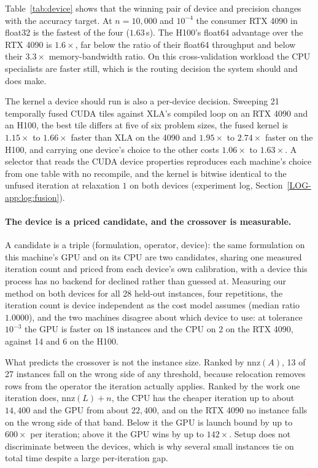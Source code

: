 Table~\ref{tab:device} shows that the winning pair of device and precision
changes with the accuracy target. At $n = 10{,}000$ and $10^{-4}$ the consumer
RTX 4090 in float32 is the fastest of the four ($1.63$\,s). The H100's float64
advantage over the RTX 4090 is $1.6\times$, far below the ratio of their float64
throughput and below their $3.3\times$ memory-bandwidth ratio. On this
cross-validation workload the CPU specialists are faster still, which is the
routing decision the system should and does make.

The kernel a device should run is also a per-device decision. Sweeping 21
temporally fused CUDA tiles against XLA's compiled loop on an RTX 4090 and an
H100, the best tile differs at five of six problem sizes, the fused kernel is
$1.15\times$ to $1.66\times$ faster than XLA on the 4090 and $1.95\times$ to
$2.74\times$ faster on the H100, and carrying one device's choice to the other
costs $1.06\times$ to $1.63\times$. A selector that reads the CUDA device
properties reproduces each machine's choice from one table with no recompile,
and the kernel is bitwise identical to the unfused iteration at relaxation $1$
on both devices (experiment log, Section~\ref{LOG-app:log:fusion}).

\paragraph{The device is a priced candidate, and the crossover is measurable.}
A candidate is a triple (formulation, operator, device): the same formulation on
this machine's GPU and on its CPU are two candidates, sharing one measured
iteration count and priced from each device's own calibration, with a device
this process has no backend for declined rather than guessed at. Measuring our
method on both devices for all 28 held-out instances, four repetitions, the
iteration count is device independent as the cost model assumes (median ratio
$1.0000$), and the two machines disagree about which device to use: at
tolerance $10^{-3}$ the GPU is faster on 18 instances and the CPU on 2 on the
RTX 4090, against 14 and 6 on the H100.

What predicts the crossover is not the instance size. Ranked by $\mathrm{nnz}(A)$,
13 of 27 instances fall on the wrong side of any threshold, because relocation
removes rows from the operator the iteration actually applies. Ranked by the
work one iteration does, $\mathrm{nnz}(L) + n$, the CPU has the cheaper
iteration up to about $14{,}400$ and the GPU from about $22{,}400$, and on the
RTX 4090 no instance falls on the wrong side of that band. Below it the GPU is
launch bound by up to $600\times$ per iteration; above it the GPU wins by up to
$142\times$. Setup does not discriminate between the devices, which is why
several small instances tie on total time despite a large per-iteration gap.

